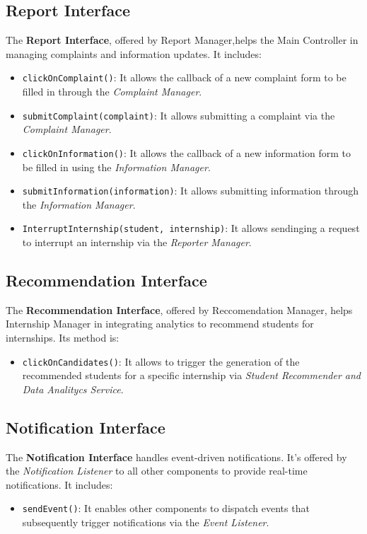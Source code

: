 \subsection{Report Interface}
The \textbf{Report Interface}, offered by Report Manager,helps the Main Controller in managing complaints and information updates. It includes:
\begin{itemize}
    \item \texttt{clickOnComplaint()}: It allows the callback of a new complaint form to be filled in through the \textit{Complaint Manager}.
    \item \texttt{submitComplaint(complaint)}: It allows submitting a complaint via the \textit{Complaint Manager}.
    \item \texttt{clickOnInformation()}: It allows the callback of a new information form to be filled in using the \textit{Information Manager}.
    \item \texttt{submitInformation(information)}: It allows submitting information through the \textit{Information Manager}.
    \item \texttt{InterruptInternship(student, internship)}: It allows sendinging a request to interrupt an internship via the \textit{Reporter Manager}.
\end{itemize}

\subsection{Recommendation Interface}
The \textbf{Recommendation Interface}, offered by Reccomendation Manager, helps Internship Manager in integrating analytics to recommend students for internships. Its method is:
\begin{itemize}
    \item \texttt{clickOnCandidates()}: It allows to trigger the generation of the recommended students for a specific internship via \textit{Student Recommender and Data Analitycs Service}.
\end{itemize}

\subsection{Notification Interface}
The \textbf{Notification Interface} handles event-driven notifications. It's offered by the \textit{Notification Listener} to all other components to provide real-time notifications. It includes:
\begin{itemize}
    \item \texttt{sendEvent()}: It enables other components to dispatch events that subsequently trigger notifications via the \textit{Event Listener}.
\end{itemize}

